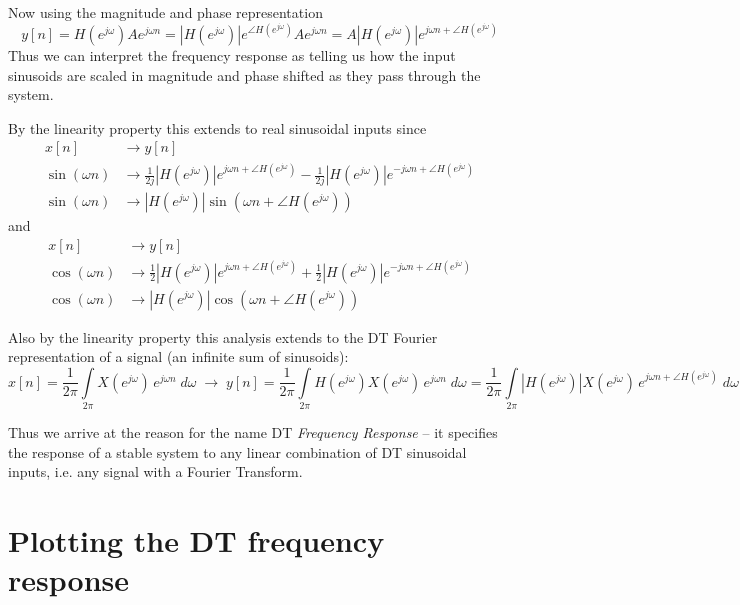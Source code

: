 Now using the magnitude and phase representation
\[
y[n] = H\left(e^{j\omega}\right) A e^{j\omega n} = |H\left(e^{j\omega}\right)|e^{\angle H\left(e^{j\omega}\right)} A e^{j\omega n} = A |H\left(e^{j\omega}\right)| e^{j\omega n + \angle H\left(e^{j\omega}\right)} 
\]
Thus we can interpret the frequency response as telling us how the input sinusoids are scaled in magnitude and phase shifted as they pass through the system.

By the linearity property this extends to real sinusoidal inputs since
\begin{align*}
  x[n] &\longrightarrow y[n]\\
  \sin(\omega n) &\longrightarrow \frac{1}{2j}|H\left(e^{j\omega}\right)| e^{j\omega n + \angle H\left(e^{j\omega}\right)} - \frac{1}{2j}|H\left(e^{j\omega}\right)| e^{-j\omega n + \angle H\left(e^{j\omega}\right)}\\
  \sin(\omega n) &\longrightarrow |H\left(e^{j\omega}\right)|\sin(\omega n + \angle H\left(e^{j\omega}\right))  
\end{align*}
and
\begin{align*}
  x[n] &\longrightarrow y[n]\\
  \cos(\omega n) &\longrightarrow \frac{1}{2}|H\left(e^{j\omega}\right)| e^{j\omega n + \angle H\left(e^{j\omega}\right)} + \frac{1}{2}|H\left(e^{j\omega}\right)| e^{-j\omega n + \angle H\left(e^{j\omega}\right)}\\
  \cos(\omega n) &\longrightarrow |H\left(e^{j\omega}\right)|\cos(\omega n + \angle H\left(e^{j\omega}\right))  
\end{align*}

Also by the linearity property this analysis extends to the DT Fourier representation of a signal (an infinite sum of sinusoids):
\[
x[n] = \frac{1}{2\pi}\int\limits_{2\pi} X\left(e^{j \omega}\right) \, e^{j \omega n}\; d\omega \;\longrightarrow\; y[n] = \frac{1}{2\pi}\int\limits_{2\pi} H\left(e^{j \omega}\right) X\left(e^{j \omega}\right) \, e^{j \omega n}\; d\omega = \frac{1}{2\pi}\int\limits_{2\pi} \left| H\left(e^{j\omega}\right)\right| X\left(e^{j\omega}\right) \, e^{j \omega n + \angle H\left(e^{j\omega}\right)}\; d\omega
\]

Thus we arrive at the reason for the name DT \textit{Frequency Response} -- it specifies the response of a stable system to any linear combination of DT sinusoidal inputs, i.e. any signal with a Fourier Transform.

\section{Plotting the DT frequency response}

